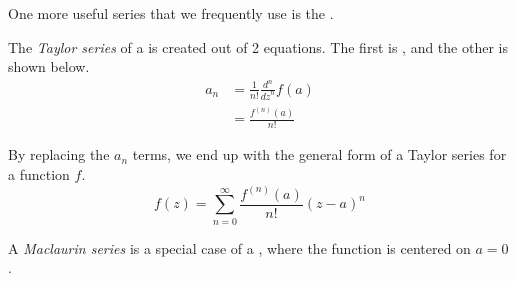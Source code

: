 One more useful series that we frequently use is the .

\begin{definition}\label{def:Complex_Taylor_Series}
  The \emph{Taylor series} of a  is created out of 2 equations.
  The first is , and the other is shown below.
  \begin{equation*}
    \begin{aligned}
      a_{n} &= \frac{1}{n!} \frac{d^{n}}{{dz}^{n}} f(a) \\
      &= \frac{f^{(n)}(a)}{n!}
    \end{aligned}
  \end{equation*}

  By replacing the $a_{n}$ terms, we end up with the general form of a Taylor series for a function $f$.
  \begin{equation}\label{eq:Complex_Taylor_Series}
    f(z) = \sum_{n=0}^{\infty} \frac{f^{(n)}(a)}{n!} {(z-a)}^{n}
  \end{equation}

  \begin{remark}\label{rmk:Complex_Maclaurin_Series}
    A \emph{Maclaurin series} is a special case of a , where the function is centered on $a=0$.
  \end{remark}
\end{definition}

